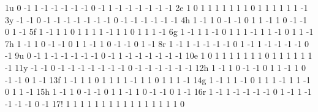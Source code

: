 \documentclass{article}
\begin{document}
\begin{Schunk}
\begin{Soutput}
1u   0 -1 1 -1 -1 -1 -1 -1  0 -1 1 -1 -1 -1 -1 -1 -1
2e   1  0 1  1  1  1  1  1  1  0 1  1  1  1  1  1 -1
3y  -1 -1 0 -1 -1 -1 -1 -1 -1 -1 0 -1 -1 -1 -1 -1 -1
4h   1 -1 1  0 -1 -1  0  1  1 -1 1  0 -1 -1  0  1 -1
5f   1 -1 1  1  0  1  1  1  1 -1 1  1  0  1  1  1 -1
6g   1 -1 1  1 -1  0  1  1  1 -1 1  1 -1  0  1  1 -1
7h   1 -1 1  0 -1 -1  0  1  1 -1 1  0 -1 -1  0  1 -1
8r   1 -1 1 -1 -1 -1 -1  0  1 -1 1 -1 -1 -1 -1  0 -1
9u   0 -1 1 -1 -1 -1 -1 -1  0 -1 1 -1 -1 -1 -1 -1 -1
10e  1  0 1  1  1  1  1  1  1  0 1  1  1  1  1  1 -1
11y -1 -1 0 -1 -1 -1 -1 -1 -1 -1 0 -1 -1 -1 -1 -1 -1
12h  1 -1 1  0 -1 -1  0  1  1 -1 1  0 -1 -1  0  1 -1
13f  1 -1 1  1  0  1  1  1  1 -1 1  1  0  1  1  1 -1
14g  1 -1 1  1 -1  0  1  1  1 -1 1  1 -1  0  1  1 -1
15h  1 -1 1  0 -1 -1  0  1  1 -1 1  0 -1 -1  0  1 -1
16r  1 -1 1 -1 -1 -1 -1  0  1 -1 1 -1 -1 -1 -1  0 -1
17!  1  1 1  1  1  1  1  1  1  1 1  1  1  1  1  1  0
\end{Soutput}
\end{Schunk}
\end{document}
